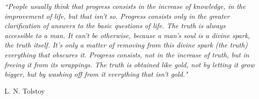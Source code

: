 \documentclass[12pt, twoside]{Thesis} %
\begin{document}



\clearpage %



\pagestyle{empty} %

\null\vfill %

\textit{``People usually think that progress consists in the increase of knowledge, in the improvement of life, but that isn't so. Progress consists only in the greater clarification of answers to the basic questions of life. The truth is always accessible to a man. It can't be otherwise, because a man's soul is a divine spark, the truth itself. It's only a matter of removing from this divine spark (the truth) everything that obscures it. Progress consists, not in the increase of truth, but in freeing it from its wrappings. The truth is obtained like gold, not by letting it grow bigger, but by washing off from it everything that isn't gold."}

\begin{flushright}
L. N. Tolstoy
\end{flushright}

\vfill\vfill\vfill\vfill\vfill\vfill\null %

\clearpage %

\end{document}
